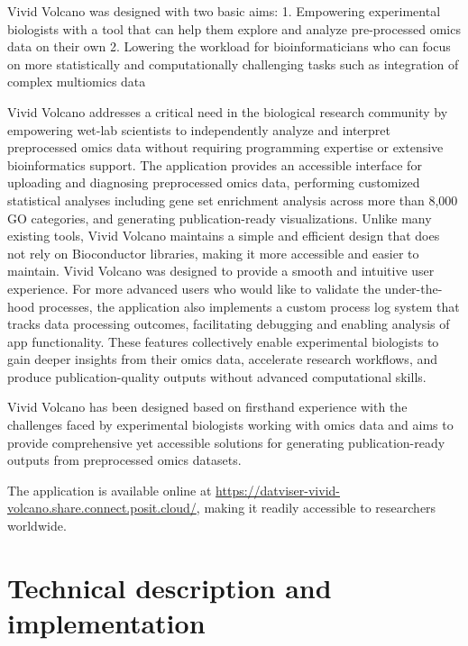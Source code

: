 \documentclass[
]{article}
\begin{document}
Vivid Volcano was designed with two basic aims: 1. Empowering
experimental biologists with a tool that can help them explore and
analyze pre-processed omics data on their own 2. Lowering the workload
for bioinformaticians who can focus on more statistically and
computationally challenging tasks such as integration of complex
multiomics data

Vivid Volcano addresses a critical need in the biological research
community by empowering wet-lab scientists to independently analyze and
interpret preprocessed omics data without requiring programming
expertise or extensive bioinformatics support. The application provides
an accessible interface for uploading and diagnosing preprocessed omics
data, performing customized statistical analyses including gene set
enrichment analysis across more than 8,000 GO categories, and generating
publication-ready visualizations. Unlike many existing tools, Vivid
Volcano maintains a simple and efficient design that does not rely on
Bioconductor libraries, making it more accessible and easier to
maintain. Vivid Volcano was designed to provide a smooth and intuitive
user experience. For more advanced users who would like to validate the
under-the-hood processes, the application also implements a custom
process log system that tracks data processing outcomes, facilitating
debugging and enabling analysis of app functionality. These features
collectively enable experimental biologists to gain deeper insights from
their omics data, accelerate research workflows, and produce
publication-quality outputs without advanced computational skills.

Vivid Volcano has been designed based on firsthand experience with the
challenges faced by experimental biologists working with omics data and
aims to provide comprehensive yet accessible solutions for generating
publication-ready outputs from preprocessed omics datasets.

The application is available online at
\url{https://datviser-vivid-volcano.share.connect.posit.cloud/}, making
it readily accessible to researchers worldwide.

\section{Technical description and
implementation}\label{technical-description-and-implementation}
\end{document}
